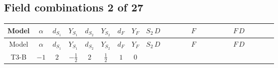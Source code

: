 \documentclass[8pt]{article}
\begin{document}
\begin{landscape}
\subsection*{Field combinations 2 of 27}
\begin{longtable}{@{}cccccccc >{\raggedright\arraybackslash}p{0.21\linewidth} >{\raggedright\arraybackslash}p{0.21\linewidth} >{\raggedright\arraybackslash}p{0.21\linewidth}@{}}
\toprule
Model & $\alpha$ & $d_{S_1}$ & $Y_{S_1}$ & $d_{S_2}$ & $Y_{S_2}$ & $d_F$ & $Y_F$ & $S_2\,D$ & $F$ & $F\,D$ \\
\midrule
\endfirsthead
\toprule
Model & $\alpha$ & $d_{S_1}$ & $Y_{S_1}$ & $d_{S_2}$ & $Y_{S_2}$ & $d_F$ & $Y_F$ & $S_2\,D$ & $F$ & $F\,D$ \\
\midrule
\endhead
T3-B & $-1$ & $2$ & $-\frac{1}{2}$ & $2$ & $\frac{1}{2}$ & $1$ & $0$ & \scriptsize\adjustbox{max width=\linewidth}{$\begin{gathered} -\frac{\hbar  S_{2,j_2} S_{2,j_2}{}^{\dagger } D_{\mu _1}\left(S_{2,j_1}\right){}^{\dagger } D_{\mu _1}\left(S_{2,j_1}\right) g_2^4}{80 m_1^2} \\ -\frac{2 \hbar  S_{2,j_2} S_{2,j_2}{}^{\dagger } \left(\lambda_{12}^{(1)}^{(2)}\right){}^2 D_{\mu _1}\left(S_{2,j_1}\right){}^{\dagger } D_{\mu _1}\left(S_{2,j_1}\right)}{9 m_1^2} \\ -\frac{\hbar  g_1^4 S_{2,j_2} S_{2,j_2}{}^{\dagger } D_{\mu _1}\left(S_{2,j_1}\right){}^{\dagger } D_{\mu _1}\left(S_{2,j_1}\right)}{240 m_1^2}\end{gathered}$} & \scriptsize\adjustbox{max width=\linewidth}{$\begin{gathered} -\frac{1}{4} \text{Delta}\left(r_1,r_2\right) F_{r_1}{}^T\, C\, F_{r_2} M_F \\ -\frac{1}{4} \text{Delta}\left(r_1,r_2\right) F_{r_2}{}^T\, C\, F_{r_1} M_F \\ +\frac{\hbar  \overline{y_{1,i_1,r_1}} F_{r_1}{}^T\, C\, F_{r_2} M_F y_{1,i_1,r_2}}{4 \epsilon }\end{gathered}$} & \scriptsize\adjustbox{max width=\linewidth}{$\begin{gathered} +\frac{1}{2} i F_{r_2}{}^T\, C\, \gamma ^{\mu _1}\, D_{\mu _1}\left(F_{r_2}\right) \\ -\frac{\hbar  \overline{y_{1,i_1,r_2}} D_{\mu _1}\left(F_{r_1}\right){}^T\, C\, \gamma ^{\mu _1}\, \gamma ^{\mu _2}\, P_R\, D_{\mu _2}\left(F_{r_2}\right) M_F y_{1,i_1,r_1}}{6 m_1^2} \\ +\frac{\hbar  \overline{y_{1,i_1,r_1}} D_{\mu _1}\left(F_{r_1}\right){}^T\, C\, \gamma ^{\mu _1}\, \gamma ^{\mu _2}\, P_R\, D_{\mu _2}\left(F_{r_2}\right) M_F y_{1,i_1,r_2}}{6 m_1^2}\end{gathered}$} \\

\end{longtable}
\end{landscape}
\end{document}
